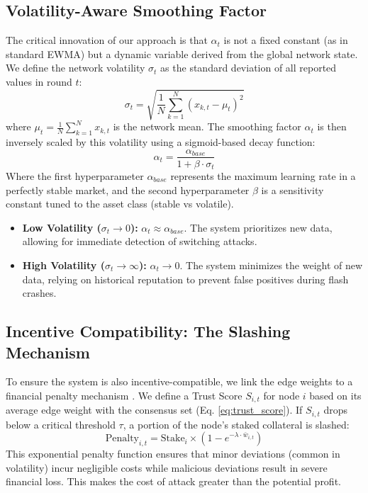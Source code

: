 \documentclass{ieeeaccess}
\begin{document}
\subsection{Volatility-Aware Smoothing Factor}
The critical innovation of our approach is that $\alpha_t$ is not a fixed constant (as in standard EWMA) but a dynamic variable derived from the global network state. We define the network volatility $\sigma_t$ as the standard deviation of all reported values in round $t$:
\begin{equation}
\sigma_t = \sqrt{\frac{1}{N} \sum_{k=1}^{N} (x_{k,t} - \mu_t)^2}
\end{equation}
where $\mu_t = \frac{1}{N}\sum_{k=1}^{N} x_{k,t}$ is the network mean. The smoothing factor $\alpha_t$ is then inversely scaled by this volatility using a sigmoid-based decay function:
\begin{equation}
\alpha_t = \frac{\alpha_{base}}{1 + \beta \cdot \sigma_t}
\label{eq:alpha}
\end{equation}
Where the first hyperparameter $\alpha_{base}$ represents the maximum learning rate in a perfectly stable market, and the second hyperparameter $\beta$ is a sensitivity constant tuned to the asset class (stable vs volatile).
\begin{itemize}
    \item \textbf{Low Volatility ($\sigma_t \to 0$):} $\alpha_t \approx \alpha_{base}$. The system prioritizes new data, allowing for immediate detection of switching attacks.
    \item \textbf{High Volatility ($\sigma_t \to \infty$):} $\alpha_t \to 0$. The system minimizes the weight of new data, relying on historical reputation to prevent false positives during flash crashes.
\end{itemize}

\subsection{Incentive Compatibility: The Slashing Mechanism}
To ensure the system is also incentive-compatible, we link the edge weights to a financial penalty mechanism \cite{b15}. We define a Trust Score $S_{i,t}$ for node $i$ based on its average edge weight with the consensus set (Eq. \ref{eq:trust_score}). If $S_{i,t}$ drops below a critical threshold $\tau$, a portion of the node's staked collateral is slashed:
\begin{equation}
\text{Penalty}_{i,t} = \text{Stake}_i \times \left( 1 - e^{-\lambda \cdot \bar{w}_{i,t}} \right)
\label{eq:slashing}
\end{equation}
This exponential penalty function ensures that minor deviations (common in volatility) incur negligible costs while malicious deviations result in severe financial loss. This makes the cost of attack greater than the potential profit.
\end{document}
